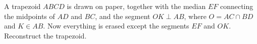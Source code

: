 A trapezoid $ABCD$ is drawn on paper, together with the median $EF$ connecting the midpoints of $AD$ and $BC$, and the segment $OK \perp AB$, where $O = AC \cap BD$ and $K \in AB$. Now everything is erased except the segments $EF$ and $OK$. Reconstruct the trapezoid.
